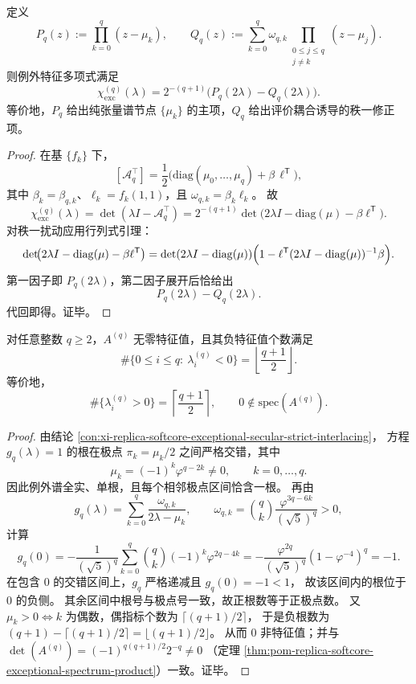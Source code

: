 \begin{conclusion}[例外特征多项式的拉格朗日型闭式]\label{con:xi-replica-softcore-exceptional-characteristic-lagrange-form}
定义
\[
P_q(z):=\prod_{k=0}^{q}(z-\mu_k),
\qquad
Q_q(z):=\sum_{k=0}^{q}\omega_{q,k}\prod_{\substack{0\le j\le q\\ j\ne k}}(z-\mu_j).
\]
则例外特征多项式满足
\[
\chi_{\mathrm{exc}}^{(q)}(\lambda)
=2^{-(q+1)}\bigl(P_q(2\lambda)-Q_q(2\lambda)\bigr).
\]
等价地，\(P_q\) 给出纯张量谱节点 \(\{\mu_k\}\) 的主项，\(Q_q\) 给出评价耦合诱导的秩一修正项。
\end{conclusion}
\begin{proof}
在基 \(\{f_k\}\) 下，
\[
[\mathcal A_q^{\top}]
=\frac12\bigl(\mathrm{diag}(\mu_0,\dots,\mu_q)+\beta\,\ell^{\mathsf T}\bigr),
\]
其中 \(\beta_k=\beta_{q,k}\)、\(\ell_k=f_k(1,1)\)，且 \(\omega_{q,k}=\beta_k\ell_k\)。
故
\[
\chi_{\mathrm{exc}}^{(q)}(\lambda)
=\det(\lambda I-\mathcal A_q^{\top})
=2^{-(q+1)}\det\!\bigl(2\lambda I-\mathrm{diag}(\mu)-\beta\ell^{\mathsf T}\bigr).
\]
对秩一扰动应用行列式引理：
\[
\det\!\bigl(2\lambda I-\mathrm{diag}(\mu)-\beta\ell^{\mathsf T}\bigr)
=\det(2\lambda I-\mathrm{diag}(\mu))
\Bigl(1-\ell^{\mathsf T}(2\lambda I-\mathrm{diag}(\mu))^{-1}\beta\Bigr).
\]
第一因子即 \(P_q(2\lambda)\)，第二因子展开后恰给出
\[
P_q(2\lambda)-Q_q(2\lambda).
\]
代回即得。证毕。
\end{proof}

\begin{conclusion}\label{con:xi-replica-softcore-exceptional-secular-origin-rigidity}
对任意整数 \(q\ge2\)，\(A^{(q)}\) 无零特征值，且其负特征值个数满足
\[
\#\{0\le i\le q:\ \lambda_i^{(q)}<0\}=\left\lfloor\frac{q+1}{2}\right\rfloor.
\]
等价地，
\[
\#\{\lambda_i^{(q)}>0\}=\left\lceil\frac{q+1}{2}\right\rceil,\qquad
0\notin\mathrm{spec}(A^{(q)}).
\]
\end{conclusion}
\begin{proof}
由结论 \ref{con:xi-replica-softcore-exceptional-secular-strict-interlacing}，
方程 \(g_q(\lambda)=1\) 的根在极点
\(\pi_k=\mu_k/2\) 之间严格交错，其中
\[
\mu_k=(-1)^k\varphi^{q-2k}\neq0,\qquad k=0,\dots,q.
\]
因此例外谱全实、单根，且每个相邻极点区间恰含一根。
再由
\[
g_q(\lambda)=\sum_{k=0}^{q}\frac{\omega_{q,k}}{2\lambda-\mu_k},\qquad
\omega_{q,k}=\binom{q}{k}\frac{\varphi^{3q-6k}}{(\sqrt5)^q}>0,
\]
计算
\[
g_q(0)
=-\frac1{(\sqrt5)^q}\sum_{k=0}^{q}\binom{q}{k}(-1)^k\varphi^{2q-4k}
=-\frac{\varphi^{2q}}{(\sqrt5)^q}(1-\varphi^{-4})^q
=-1.
\]
在包含 \(0\) 的交错区间上，\(g_q\) 严格递减且 \(g_q(0)=-1<1\)，
故该区间内的根位于 \(0\) 的负侧。
其余区间中根号与极点号一致，故正根数等于正极点数。
又 \(\mu_k>0\iff k\) 为偶数，偶指标个数为 \(\lceil(q+1)/2\rceil\)，
于是负根数为 \((q+1)-\lceil(q+1)/2\rceil=\lfloor(q+1)/2\rfloor\)。
从而 \(0\) 非特征值；并与
\(\det(A^{(q)})=(-1)^{q(q+1)/2}2^{-q}\neq0\)
（定理 \ref{thm:pom-replica-softcore-exceptional-spectrum-product}）一致。证毕。
\end{proof}

